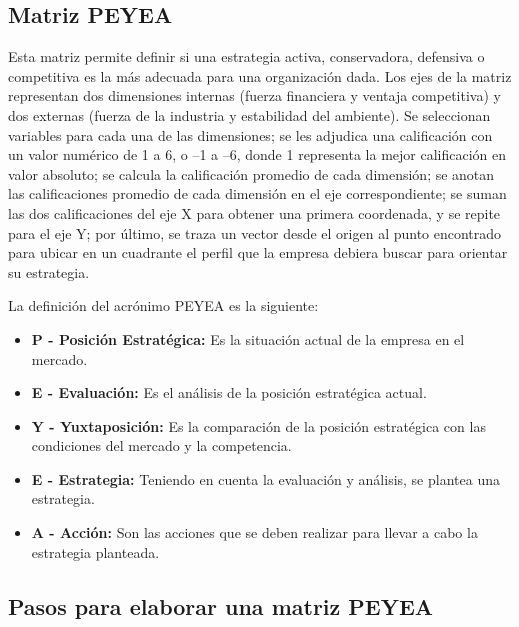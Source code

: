 \subsection{Matriz PEYEA}
Esta matriz permite definir si una estrategia activa, conservadora, defensiva o competitiva es la más adecuada para una organización dada. Los ejes de la matriz representan dos dimensiones internas (fuerza financiera y ventaja competitiva) y dos externas (fuerza de la industria y estabilidad del ambiente). Se seleccionan variables para cada una de las dimensiones; se les adjudica una calificación con un valor numérico de 1 a 6, o –1 a –6, donde 1 representa la mejor calificación en valor absoluto; se calcula la calificación promedio de cada dimensión; se anotan las calificaciones promedio de cada dimensión en el eje correspondiente; se suman las dos calificaciones del eje X para obtener una primera coordenada, y se repite para el eje Y; por último, se traza un vector desde el origen al punto encontrado para ubicar en un cuadrante el perfil que la empresa debiera buscar para orientar su estrategia.\cite{DOFA}

La definición del acrónimo PEYEA es la siguiente:
\begin{itemize}
    \item \textbf{P - Posición Estratégica:} Es la situación actual de la empresa en el mercado.
    \item \textbf{E - Evaluación:} Es el análisis de la posición estratégica actual.
    \item \textbf{Y - Yuxtaposición:} Es la comparación de la posición estratégica con las condiciones del mercado y la competencia.
    \item \textbf{E - Estrategia:} Teniendo en cuenta la evaluación y análisis, se plantea una estrategia.
    \item \textbf{A - Acción:} Son las acciones que se deben realizar para llevar a cabo la estrategia planteada.
\end{itemize}

\subsection{Pasos para elaborar una matriz PEYEA}

